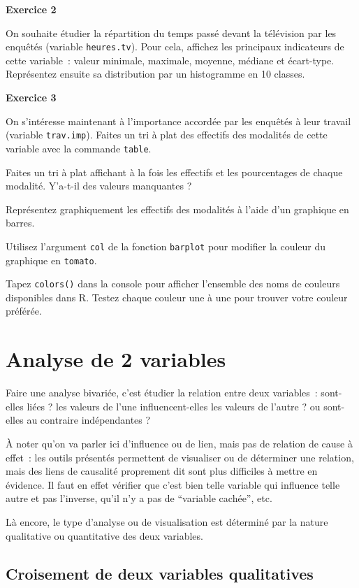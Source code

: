 \documentclass[12pt,]{book}
\begin{document}
\textbf{Exercice 2}

On souhaite étudier la répartition du temps passé devant la télévision par les enquêtés (variable \texttt{heures.tv}). Pour cela, affichez les principaux indicateurs de cette variable~: valeur minimale, maximale, moyenne, médiane et écart-type. Représentez ensuite sa distribution par un histogramme en 10 classes.

\textbf{Exercice 3}

On s'intéresse maintenant à l'importance accordée par les enquêtés à leur travail (variable \texttt{trav.imp}). Faites un tri à plat des effectifs des modalités de cette variable avec la commande \texttt{table}.

Faites un tri à plat affichant à la fois les effectifs et les pourcentages de chaque modalité. Y'a-t-il des valeurs manquantes ?

Représentez graphiquement les effectifs des modalités à l'aide d'un graphique en barres.

Utilisez l'argument \texttt{col} de la fonction \texttt{barplot} pour modifier la couleur du graphique en
\texttt{tomato}.

Tapez \texttt{colors()} dans la console pour afficher l'ensemble des noms de couleurs disponibles dans R. Testez chaque couleur une à une pour trouver votre couleur préférée.

\hypertarget{analyse-de-2-variables}{%
\section{Analyse de 2 variables}\label{analyse-de-2-variables}}

Faire une analyse bivariée, c'est étudier la relation entre deux variables~: sont-elles liées ? les valeurs de l'une influencent-elles les valeurs de l'autre ? ou sont-elles au contraire indépendantes ?

À noter qu'on va parler ici d'influence ou de lien, mais pas de relation de cause à effet~: les outils présentés permettent de visualiser ou de déterminer une relation, mais des liens de causalité proprement dit sont plus difficiles à mettre en évidence. Il faut en effet vérifier que c'est bien telle variable qui influence telle autre et pas l'inverse, qu'il n'y a pas de ``variable cachée'', etc.

Là encore, le type d'analyse ou de visualisation est déterminé par la nature qualitative ou quantitative des deux variables.

\hypertarget{croisement-de-deux-variables-qualitatives}{%
\subsection{Croisement de deux variables qualitatives}\label{croisement-de-deux-variables-qualitatives}}
\end{document}
